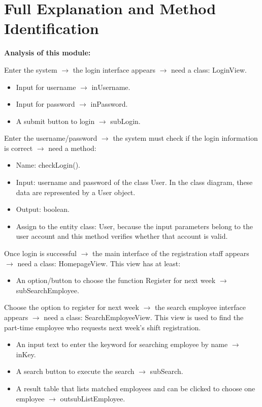 \section{Full Explanation and Method Identification}


\textbf{Analysis of this module:}

Enter the system $\rightarrow$ the login interface appears $\rightarrow$ need a class: LoginView.

\begin{itemize}
    \item Input for username $\rightarrow$ inUsername.
    \item Input for password $\rightarrow$ inPassword.
    \item A submit button to login $\rightarrow$ subLogin.
\end{itemize}

Enter the username/password $\rightarrow$ the system must check if the login information is correct $\rightarrow$ need a method:

\begin{itemize}
    \item Name: checkLogin().
    \item Input: username and password of the class User. In the class diagram, these data are represented by a User object.
    \item Output: boolean.
    \item Assign to the entity class: User, because the input parameters belong to the user account and this method verifies whether that account is valid.
\end{itemize}

Once login is successful $\rightarrow$ the main interface of the registration staff appears $\rightarrow$ need a class: HomepageView. This view has at least:

\begin{itemize}
    \item An option/button to choose the function Register for next week $\rightarrow$ subSearchEmployee.
\end{itemize}

Choose the option to register for next week $\rightarrow$ the search employee interface appears $\rightarrow$ need a class: SearchEmployeeView. This view is used to find the part-time employee who requests next week's shift registration.

\begin{itemize}
    \item An input text to enter the keyword for searching employee by name $\rightarrow$ inKey.
    \item A search button to execute the search $\rightarrow$ subSearch.
    \item A result table that lists matched employees and can be clicked to choose one employee $\rightarrow$ outsubListEmployee.
\end{itemize}

